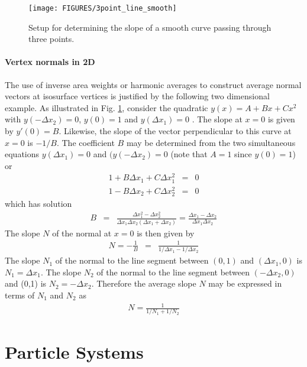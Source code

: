\documentclass[11pt,twoside]{book}
\begin{document}
%
%

\begin{figure}[\figoptions]
\begin{center}
\texttt{[image: FIGURES/3point\_line\_smooth]}
\end{center}
\caption{Setup for determining the slope of a smooth curve passing through three points.}
\label{figlinesmooth}%
\end{figure}

\paragraph{Vertex normals in 2D} The use of inverse area weights or
harmonic averages to construct average normal vectors at isosurface
vertices is justified by the following two dimensional example.
As illustrated in Fig. \ref{figlinesmooth}, consider the
quadratic $y(x)=A+Bx+Cx^2$ with $y(-\Delta x_2)=0$,
$y(0)=1$ and $y(\Delta x_1)=0$ .  The slope at $x=0$ is given by $y'(0)=B$.
Likewise, the slope of the vector perpendicular to this curve at $x=0$ is $-1/B$.
The coefficient $B$ may be determined from the two simultaneous equations
$y(\Delta x_1)=0$ and  $(y(-\Delta x_2)=0$ (note that $A=1$ since $y(0)=1$) or
\begin{eqnarray}
1+B\Delta x_1 + C \Delta x_1^2 &= &0\\
1-B\Delta x_2 + C \Delta x_2^2 &= &0
\end{eqnarray}
which has solution
\begin{eqnarray}
B&=&\frac{\Delta x_1^2-\Delta x_2^2}{\Delta x_1\Delta x_2(\Delta x_1+\Delta x_2)}=
\frac{\Delta x_1-\Delta x_2}{\Delta x_1\Delta x_2}
\end{eqnarray}
The slope $N$ of the normal at $x=0$ is then given by
\begin{eqnarray}
N=-\frac{1}{B}&=&\frac{1}{1/\Delta x_1-1/\Delta x_2}
\end{eqnarray}
The slope $N_1$ of the normal to the line segment between
$(0,1)$ and $(\Delta x_1,0)$ is $N_1=\Delta x_1$.
The slope $N_2$ of the normal to the line segment between
$(-\Delta x_2,0)$ and (0,1) is $N_2=-\Delta x_2$.
Therefore the average slope $N$ may be expressed in terms of
$N_1$ and $N_2$ as
\begin{eqnarray}
N=\frac{1}{1/N_1+1/N_2}
\end{eqnarray}

\section{Particle Systems}
\end{document}
